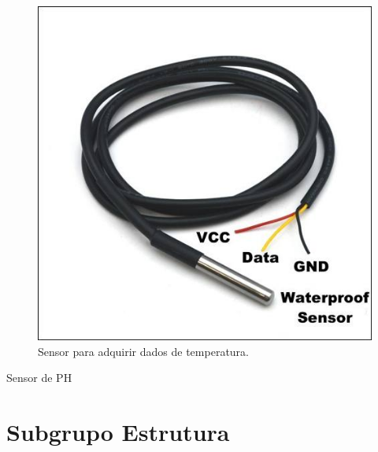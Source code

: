  \begin{figure} [!htp]
	\centering
	\includegraphics[scale=0.6]{figuras/sensortemp}
	\caption{Sensor para adquirir dados de temperatura.}
	\label{sensortemp}
\end{figure}

Sensor de PH

\section{Subgrupo Estrutura}



